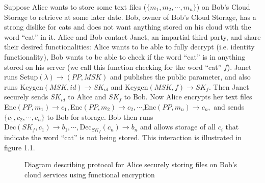\documentclass[12pt,twoside]{reedthesis}
\newcommand{\dec}[0]{\text{Dec}}
\begin{document}
\par Suppose Alice wants to store some text files ($\{m_1,m_2,\cdots, m_n \}$) on Bob's Cloud Storage to retrieve at some later date.
 Bob, owner of Bob's Cloud Storage, has a strong dislike for cats and does not want anything stored on
  his cloud with the word ``cat'' in it. Alice and Bob contact Janet, an impartial third party, and share their desired functionalities: Alice wants to be able to fully decrypt (i.e. identity functionality), Bob wants to be able to check if the word ``cat'' is in anything stored on his server (we call this function checking for the word ``cat'' $f$). Janet runs Setup$(\lambda)\rightarrow (PP, MSK)$ and publishes the public parameter, and also runs Keygen$(MSK,id) \rightarrow SK_{id}$ and Keygen$(MSK,f) \rightarrow SK_f$. Then Janet securely sends $SK_{id}$ to Alice and $SK_{f}$ to Bob. Now Alice encrypts her text files Enc$(PP, m_1) \rightarrow c_1,$Enc$(PP,m_2) \rightarrow c_2, \cdots $,Enc$(PP, m_n) \rightarrow c_n,$ and sends $\{c_1,c_2, \cdots, c_n \}$ to Bob for storage. Bob then runs $\dec(SK_f , c_1) \rightarrow b_1 , \cdots, \dec_{SK_f}(c_n) \rightarrow b_n $ and allows storage of all $c_i$ that indicate the word ``cat'' is not being stored.  This interaction is illustrated in figure 1.1.
  
  \begin{figure}[htbp]
	   
	       \centering


	     \caption{Diagram describing protocol for Alice securely storing files on Bob's cloud services using functional encryption}
	 \label{subd}
	\end{figure}
\end{document}
